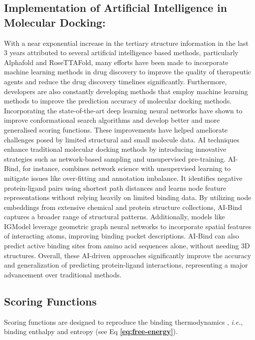 \documentclass[10pt,letterpaper]{article}
\begin{document}
{{\subsection*{Implementation of Artificial Intelligence in Molecular Docking:}
With a near exponential increase in the tertiary structure information in the last 3 years attributed to several artificial intelligence based methods, particularly Alphafold\cite{bib37} and RoseTTAFold\cite{bib38}, many efforts have been made to incorporate machine learning methods in drug discovery to improve the quality of therapeutic agents and reduce the drug discovery timelines significantly\cite{bib36}. Furthermore, developers are also constantly developing methods that employ machine learning methods to improve the prediction accuracy of molecular docking methods. Incorporating the state-of-the-art deep learning neural networks have shown to improve conformational search algorithms and develop better and more generalised scoring functions. These improvements have helped ameliorate challenges posed by limited structural and small molecule data\cite{bib39, bib40}. AI techniques enhance traditional molecular docking methods by introducing innovative strategies such as network-based sampling\cite{bib71} and unsupervised pre-training\cite{bib72, bib73}. AI-Bind\cite{bib74}, for instance, combines network science with unsupervised learning to mitigate issues like over-fitting and annotation imbalance. It identifies negative protein-ligand pairs using shortest path distances and learns node feature representations without relying heavily on limited binding data. By utilizing node embeddings from extensive chemical and protein structure collections, AI-Bind captures a broader range of structural patterns. Additionally, models like IGModel\cite{bib75} leverage geometric graph neural networks to incorporate spatial features of interacting atoms, improving binding pocket descriptions. AI-Bind can also predict active binding sites from amino acid sequences alone, without needing 3D structures. Overall, these AI-driven approaches significantly improve the accuracy and generalization of predicting protein-ligand interactions, representing a major advancement over traditional methods.

\subsection*{Scoring Functions}
Scoring functions are designed to reproduce the binding thermodynamics \cite{bib2, bib3}, \textit{i.e.}, binding enthalpy and entropy (see Eq \textbf{\ref{eq:free-energy}}).

}}
\end{document}

